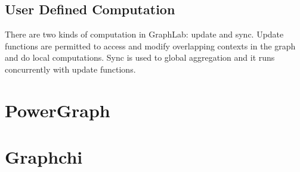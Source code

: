 \documentclass {report}
\begin{document}
\subsection{User Defined Computation}
There are two kinds of computation in GraphLab: update and sync. Update functions are permitted to access and modify overlapping contexts in the graph and do local computations. Sync is used to global aggregation and it runs concurrently with update functions.
\section{PowerGraph}
\section{Graphchi}
\end{document}
